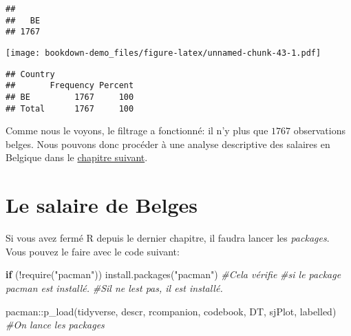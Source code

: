 \documentclass[
]{book}
\newenvironment{Shaded}{\begin{snugshade}}{\end{snugshade}}
\newcommand{\CommentTok}[1]{\textcolor[rgb]{0.56,0.35,0.01}{\textit{#1}}}
\newcommand{\ControlFlowTok}[1]{\textcolor[rgb]{0.13,0.29,0.53}{\textbf{#1}}}
\newcommand{\FunctionTok}[1]{\textcolor[rgb]{0.00,0.00,0.00}{#1}}
\newcommand{\NormalTok}[1]{#1}
\newcommand{\OtherTok}[1]{\textcolor[rgb]{0.56,0.35,0.01}{#1}}
\newcommand{\SpecialCharTok}[1]{\textcolor[rgb]{0.00,0.00,0.00}{#1}}
\newcommand{\StringTok}[1]{\textcolor[rgb]{0.31,0.60,0.02}{#1}}
\begin{document}
\begin{Shaded}
\end{Shaded}

\begin{verbatim}
## 
##   BE 
## 1767
\end{verbatim}

\begin{Shaded}
\end{Shaded}

\texttt{[image: bookdown-demo\_files/figure-latex/unnamed-chunk-43-1.pdf]}

\begin{verbatim}
## Country 
##       Frequency Percent
## BE         1767     100
## Total      1767     100
\end{verbatim}

Comme nous le voyons, le filtrage a fonctionné: il n'y plus que \(1767\) observations belges. Nous pouvons donc procéder à une analyse descriptive des salaires en Belgique dans le \protect\hyperlink{salaire_belge_stat_desc}{chapitre suivant}.

\hypertarget{salaire_belge_stat_desc}{%
\chapter{Le salaire de Belges}\label{salaire_belge_stat_desc}}

Si vous avez fermé R depuis le dernier chapitre, il faudra lancer les \emph{packages}. Vous pouvez le faire avec le code suivant:

\begin{Shaded}
\begin{Highlighting}[]
\ControlFlowTok{if}\NormalTok{ (}\SpecialCharTok{!}\FunctionTok{require}\NormalTok{(}\StringTok{"pacman"}\NormalTok{)) }\FunctionTok{install.packages}\NormalTok{(}\StringTok{"pacman"}\NormalTok{) }\CommentTok{\#Cela vérifie}
                             \CommentTok{\#si le package pacman est installé.}
                             \CommentTok{\#S\textquotesingle{}il ne l\textquotesingle{}est pas, il est installé.}

\NormalTok{pacman}\SpecialCharTok{::}\FunctionTok{p\_load}\NormalTok{(tidyverse, descr, rcompanion, codebook,}
\NormalTok{               DT, sjPlot, labelled) }\CommentTok{\#On lance les packages}
\end{Highlighting}
\end{Shaded}
\end{document}
